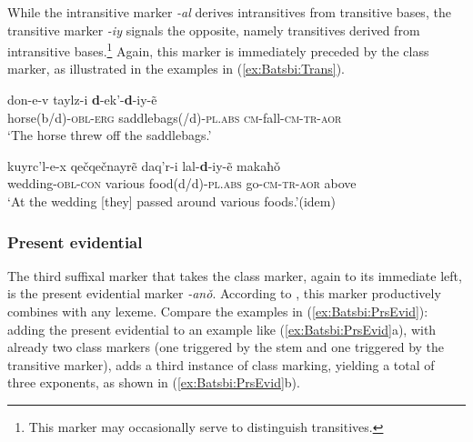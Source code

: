 \documentclass[output=paper]{langsci/langscibook}
\begin{document}
While the intransitive marker \textit{-al} derives intransitives from
transitive bases, the transitive marker \textit{-iy} signals the
opposite, namely transitives derived from intransitive
bases.\footnote{This marker may occasionally serve to distinguish
  transitives. %
} Again, this marker is immediately preceded by the class marker, as
illustrated in the examples in (\ref{ex:Batsbi:Trans}).

\begin{exe}
  \ex \label{ex:Batsbi:Trans}
  \begin{xlist}
    \ex \gll don-e-v taylz-i \textbf{d}-ek’-\textbf{d}-iy-ẽ \\
      horse(b/d)-\textsc{obl-erg} saddlebags(/d)\footnotemark-\textsc{pl.abs} \textsc{cm}-fall-\textsc{cm-tr-aor}\\
      \glt ‘The horse threw off the saddlebags.'\hfill\citep[274]{Harris09}
    
    \ex\gll kuyrc’l-e-x qečqečnayrẽ daq’r-i lal-\textbf{d}-iy-ẽ makaħǒ\\
      wedding-\textsc{obl-con} various food(d/d)-\textsc{pl.abs} go-\textsc{cm-tr-aor} above\\
      \glt ‘At the wedding [they] passed around various foods.’\hfill(idem)
  \end{xlist}
\end{exe}



\subsubsection{Present evidential}

The third suffixal marker that takes the class marker, again to its
immediate left, is the present evidential marker
\textit{-anǒ}. According to \citet{Harris09}, this marker productively
combines with any lexeme. Compare the examples in
(\ref{ex:Batsbi:PrsEvid}): adding the present evidential to an example
like (\ref{ex:Batsbi:PrsEvid}a), with already two class markers (one
triggered by the stem and one triggered by the transitive
marker), adds a third instance of class marking, yielding a total of
three exponents, as shown in (\ref{ex:Batsbi:PrsEvid}b).

\begin{exe}
  \ex \label{ex:Batsbi:PrsEvid}
  \begin{xlist}
    
  \end{xlist}
\end{exe}
\end{document}
